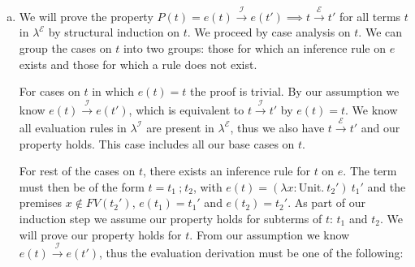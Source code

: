 \documentclass[12pt, fleqn]{article}
\begin{document}
\begin{enumerate}[(a)]
    \textbf{Case:} E-SeqNext\\
    If $t$ evaluates to $t'$ by E-SeqNext then we know $t = \texttt{unit}\:;\:t_2$ and $t' = t_2$. By the definition of $e$
    we know $e(t) = (\lambda x : \textrm{Unit}.\:t_2')\:\:\texttt{unit}$ and have the premises $x \notin FV(t_2')$ and $e(t_2) = t_2'$.
    By E-AppAbs we know $(\lambda x : \textrm{Unit}.\:t_2')\:\:\texttt{unit} \xrightarrow{\mathcal{I}} t_2'$, we throw away the argument $x$ since we know $x \notin FV(t_2')$.
    This is equivalent to $e(t) \xrightarrow{\mathcal{I}} t_2'$, and by premises $e(t') = e(t_2) = t_2'$. Therefore we've shown
    $e(t) \xrightarrow{\mathcal{I}} e(t')$ and our property holds.

    Thus we've shown that our property holds for terms for which there exists an inference rule on $e$ as part of our
    induction step. Thus our induction step holds for all cases.

    Therefore, we've shown that our property $P(t)$ holds for all terms $t$ in $\lambda^{\mathcal{E}}$ by structural 
    induction on $t$.\qed

    \item We will prove the property $P(t) = e(t) \xrightarrow{\mathcal{I}} e(t') \implies t \xrightarrow{\mathcal{E}} t'$ for all terms
    $t$ in $\lambda^\mathcal{E}$ by structural induction on $t$. We proceed by case analysis on $t$.
    We can group the cases on $t$ into two groups: those for which an inference rule on $e$ exists and those for which a rule does not
    exist.

    For cases on $t$ in which $e(t) = t$ the proof is trivial.
    By our assumption we know $e(t) \xrightarrow{\mathcal{I}} e(t')$, which is equivalent to $t \xrightarrow{\mathcal{I}} t'$
    by $e(t) = t$. We know all evaluation rules in $\lambda^{\mathcal{I}}$ are present in $\lambda^\mathcal{E}$, thus we also have 
    $t \xrightarrow{\mathcal{E}} t'$ and our property holds. This case includes all our base cases on $t$.
    
    For rest of the cases on $t$, there exists an inference rule for $t$ on $e$. The term must then be of the form $t = t_1\:\textrm{;}\:t_2$,
    with $e(t) = (\lambda x : \textrm{Unit}.\:t_2')\:t_1'$ and the premises $x \notin FV(t_2')$, $e(t_1) = t_1'$ and $e(t_2) = t_2'$.
    As part of our induction step we assume our property holds for subterms of $t$: $t_1$ and $t_2$. We will prove our property holds for $t$. 
    From our assumption we know $e(t) \xrightarrow{\mathcal{I}} e(t')$, thus the evaluation derivation must be one of the following:


\end{enumerate}
\end{document}
